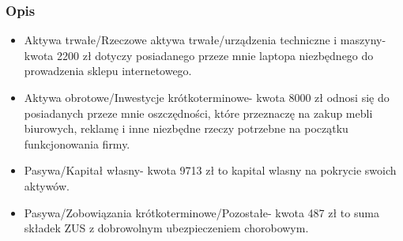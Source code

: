 	\subsubsection{Opis}
		\begin{itemize}
			\item Aktywa trwałe/Rzeczowe aktywa trwałe/urządzenia techniczne i maszyny- kwota 2200 zł dotyczy posiadanego przeze mnie laptopa niezbędnego do prowadzenia sklepu internetowego.
			\item Aktywa obrotowe/Inwestycje krótkoterminowe- kwota 8000 zł odnosi się do posiadanych przeze mnie oszczędności, które przeznaczę na zakup mebli biurowych, reklamę i inne niezbędne rzeczy potrzebne na początku funkcjonowania firmy.
			\item Pasywa/Kapitał własny- kwota 9713 zł to kapital wlasny na pokrycie swoich aktywów.
			\item Pasywa/Zobowiązania krótkoterminowe/Pozostałe- kwota 487 zł to suma składek ZUS z dobrowolnym ubezpieczeniem chorobowym.
			
			
		\end{itemize}	
	
	
	
		



